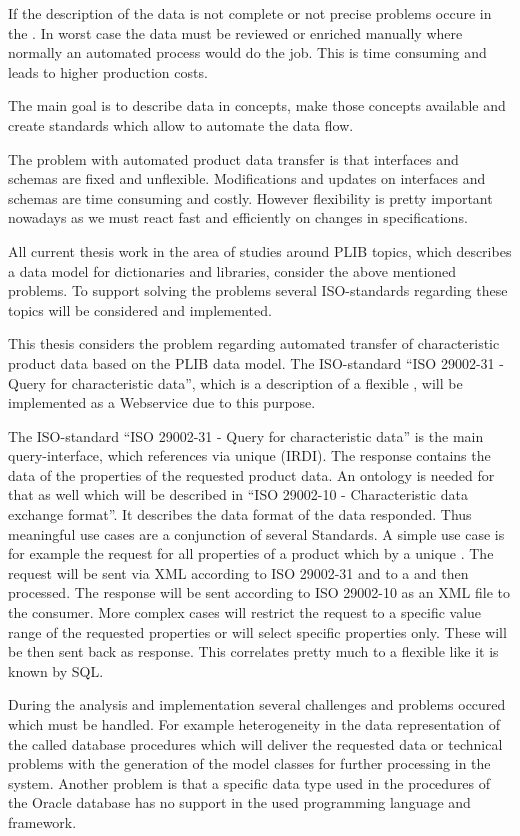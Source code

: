 If the description of the data is not complete or not precise problems occure in the . In worst case the data must be reviewed or enriched manually where normally an automated process would do the job. This is time consuming and leads to higher production costs.   

The main goal is to describe data in concepts, make those concepts available and create standards which allow to automate the data flow.  

The problem with automated product data transfer is that interfaces and schemas are fixed and unflexible. Modifications and updates on interfaces and schemas are time consuming and costly. However flexibility is pretty important nowadays as we must react fast and efficiently on changes in specifications. 
 
All current thesis work in the area of studies around \gls{PLIB} topics, which describes a data model for dictionaries and libraries, consider the above mentioned problems. To support solving the problems several ISO-standards regarding these topics will be considered and implemented. 

This thesis considers the problem regarding automated transfer of characteristic product data based on the \gls{PLIB} data model. The ISO-standard \enquote{ISO 29002-31 - Query for characteristic data}, which is a description of a flexible , will be implemented as a Webservice due to this purpose. 

The ISO-standard \enquote{ISO 29002-31 - Query for characteristic data} is the main query-interface, which references  via unique  (IRDI).
The response contains the data of the properties of the requested product data. An ontology is needed for that as well which will be described in \enquote{ISO 29002-10 - Characteristic data exchange format}. It describes the data format of the data responded. Thus meaningful use cases are a conjunction of several Standards. 
A simple use case is for example the request for all properties of a product which by a unique . The request will be sent via XML according to ISO 29002-31 and to a  and then processed. The response will be sent according to ISO 29002-10 as an XML file to the consumer. More complex cases will restrict the request to a specific value range of the requested properties or will select specific properties only. These will be then sent back as response. This  correlates pretty much to a flexible  like it is known by SQL. 

During the analysis and implementation several challenges and problems occured which must be handled. For example heterogeneity in the data representation of the called database procedures which will deliver the requested data or technical problems with the generation of the model classes for further processing in the system. Another problem is that a specific data type used in the procedures of the Oracle database has no support in the used programming language and framework.  
 
